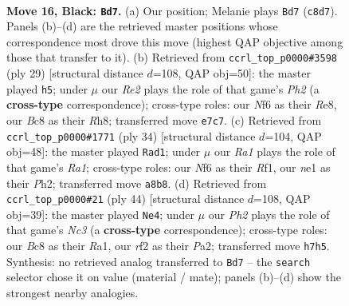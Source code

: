 \documentclass[11pt]{article}
\begin{document}
\clearpage

\begin{figure}[p]\centering
\begin{subfigure}{0.46\textwidth}\centering
\resizebox{\linewidth}{!}{%
\newchessgame
\chessboard[
  setfen={r1b3k1/p3rppp/4pn2/1Bpq4/n7/4P1P1/PP3RPP/RNQ1N1K1 b - - 1 16},
  showmover=false,
  pgfstyle=straightmove, color=movearrow, markmove={c8-d7}
]}
\caption{}
\end{subfigure}\hfill
\begin{subfigure}{0.46\textwidth}\centering
\resizebox{\linewidth}{!}{%
\newchessgame
\chessboard[
  setfen={2k1r2r/1pp4p/p1pbpn2/5qp1/P1N5/3P4/1PP1QPPP/R1B1R1K1 b - - 1 15},
  showmover=false,
  pgfstyle=straightmove, color=movearrow, markmove={h7-h5}
]}
\caption{}
\end{subfigure}
\\[4pt]
\begin{subfigure}{0.46\textwidth}\centering
\resizebox{\linewidth}{!}{%
\newchessgame
\chessboard[
  setfen={r1q1r1k1/ppp2pb1/n5pp/8/2P5/1Q1NB1P1/PP3P1P/R4RK1 w - - 3 18},
  showmover=false,
  pgfstyle=straightmove, color=movearrow, markmove={a1-d1}
]}
\caption{}
\end{subfigure}\hfill
\begin{subfigure}{0.46\textwidth}\centering
\resizebox{\linewidth}{!}{%
\newchessgame
\chessboard[
  setfen={1r1r2k1/pp3pp1/4bqnp/3Bp3/8/1PN1P1Q1/P4PPP/R1R3K1 w - - 4 23},
  showmover=false,
  pgfstyle=straightmove, color=movearrow, markmove={c3-e4}
]}
\caption{}
\end{subfigure}
\caption{\textbf{Move 16, Black: \texttt{Bd7}.} (a) Our position; Melanie plays \texttt{Bd7} (\texttt{c8d7}). Panels (b)--(d) are the retrieved master positions whose correspondence most drove this move (highest QAP objective among those that transfer to it). (b) Retrieved from \texttt{ccrl\_top\_p0000\#3598} (ply 29) [structural distance $d$=108, QAP obj=50]: the master played \texttt{h5}; under $\mu$ our \emph{Re2} plays the role of that game's \emph{Ph2} (a \textbf{cross-type} correspondence); cross-type roles: our \emph{N}f6 as their \emph{R}e8, our \emph{B}c8 as their \emph{R}h8; transferred move \texttt{e7c7}. (c) Retrieved from \texttt{ccrl\_top\_p0000\#1771} (ply 34) [structural distance $d$=104, QAP obj=48]: the master played \texttt{Rad1}; under $\mu$ our \emph{Ra1} plays the role of that game's \emph{Ra1}; cross-type roles: our \emph{N}f6 as their \emph{R}f1, our \emph{n}e1 as their \emph{P}h2; transferred move \texttt{a8b8}. (d) Retrieved from \texttt{ccrl\_top\_p0000\#21} (ply 44) [structural distance $d$=108, QAP obj=39]: the master played \texttt{Ne4}; under $\mu$ our \emph{Ph2} plays the role of that game's \emph{Nc3} (a \textbf{cross-type} correspondence); cross-type roles: our \emph{B}c8 as their \emph{R}a1, our \emph{r}f2 as their \emph{P}a2; transferred move \texttt{h7h5}. Synthesis: no retrieved analog transferred to \texttt{Bd7} -- the \texttt{search} selector chose it on value (material / mate); panels (b)--(d) show the strongest nearby analogies.}
\label{fig:thought-m31}
\end{figure}
\end{document}
